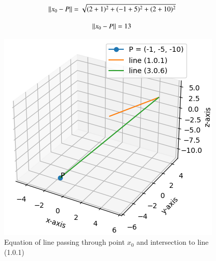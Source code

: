 \begin{equation}
 \left\lVert x_0-P\right\rVert=\sqrt{(2+1)^2+(-1+5)^2+(2+10)^2}
\end{equation}

\begin{equation}
 \left\lVert x_0-P\right\rVert=13	
\end{equation}
\begin{figure}[h]
	\centering
	\includegraphics[width=\columnwidth]{./solutions/line_plane/107/fig.png}
	\caption{Equation of line passing through point $x_0$ and intersection to line (1.0.1)}
	\label{eq:solutions/line_plane/107/fig:}
\end{figure}

